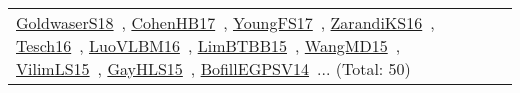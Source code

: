 {\begin{longtable}{lp{3cm}>{\raggedright\arraybackslash}p{6cm}>{\raggedright\arraybackslash}p{6cm}>{\raggedright\arraybackslash}p{8cm}}
\href{works/GoldwaserS18.pdf}{GoldwaserS18}~\cite{GoldwaserS18}, \href{works/CohenHB17.pdf}{CohenHB17}~\cite{CohenHB17}, \href{works/YoungFS17.pdf}{YoungFS17}~\cite{YoungFS17}, \href{works/ZarandiKS16.pdf}{ZarandiKS16}~\cite{ZarandiKS16}, \href{works/Tesch16.pdf}{Tesch16}~\cite{Tesch16}, \href{works/LuoVLBM16.pdf}{LuoVLBM16}~\cite{LuoVLBM16}, \href{works/LimBTBB15.pdf}{LimBTBB15}~\cite{LimBTBB15}, \href{works/WangMD15.pdf}{WangMD15}~\cite{WangMD15}, \href{works/VilimLS15.pdf}{VilimLS15}~\cite{VilimLS15}, \href{works/GayHLS15.pdf}{GayHLS15}~\cite{GayHLS15}, \href{works/BofillEGPSV14.pdf}{BofillEGPSV14}~\cite{BofillEGPSV14}... (Total: 50)\\
\end{longtable}
}

